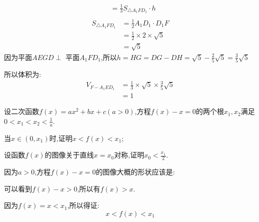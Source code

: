 \begin{questions}
\begin{solution}
\begin{penum}
\begin{align*}
				              & = \frac13S_{\triangle{A_1FD_1}}\cdot h \\
			\end{align*}
			\begin{align*}
				S_{\triangle{A_1FD_1}} & = \frac12A_1D_1\cdot D_1F          \\
				                       & = \frac12 \times 2 \times \sqrt{5} \\
				                       & = \sqrt{5}
			\end{align*}
			因为平面$AEGD \perp$ 平面$A_1FD_1$,所以$h=HG=DG - DH = \sqrt{5} - \frac25{\sqrt{5}} = \frac35\sqrt{5}$

			所以体积为:
			\begin{align*}
				V_{F-A_1ED_1} & = \frac13 \times \sqrt{5} \times \frac35\sqrt{5} \\
				              & = 1
			\end{align*}
		\end{penum}
	\end{solution}

	\question 设二次函数$f(x)=ax^2+bx+c(a>0)$,方程$f(x) - x = 0$的两个根$x_1,x_2$满足$0<x_1<x_2<\frac1a$.
	\begin{penum}
		\item 当$x\in(0,x_1)$时,证明$x<f(x)<x_1$;
		\item 设函数$f(x)$的图像关于直线$x=x_0$对称,证明$x_0<\frac{x_1}{2}$.
	\end{penum}

	\begin{solution}
		\begin{penum}
			\item 因为$a>0$,方程$f(x)-x=0$的图像大概的形状应该是:
			\begin{center}
			\end{center}
			可以看到$f(x) -x > 0$,所以有$f(x) > x$.

			因为$f(x) = x < x_1$,所以得证:
			\begin{equation*}
				x  < f(x) < x_1
			\end{equation*}


\end{penum}
\end{solution}
\end{questions}
